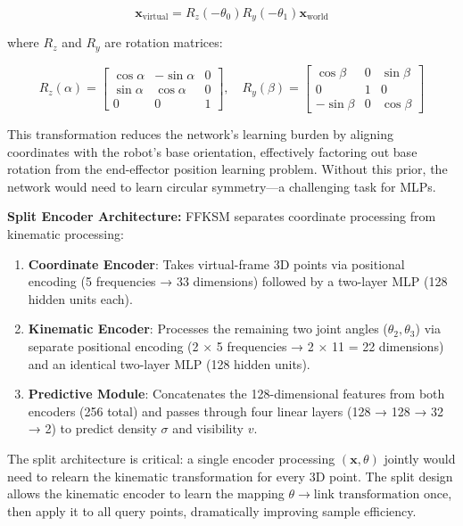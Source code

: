 \documentclass[12pt,a4paper,oneside]{report}
\begin{document}
\begin{equation}
\mathbf{x}_{\text{virtual}} = R_z(-\theta_0) R_y(-\theta_1) \mathbf{x}_{\text{world}}
\end{equation}

where $R_z$ and $R_y$ are rotation matrices:

\begin{equation}
R_z(\alpha) = \begin{bmatrix}
\cos\alpha & -\sin\alpha & 0 \\
\sin\alpha & \cos\alpha & 0 \\
0 & 0 & 1
\end{bmatrix}, \quad
R_y(\beta) = \begin{bmatrix}
\cos\beta & 0 & \sin\beta \\
0 & 1 & 0 \\
-\sin\beta & 0 & \cos\beta
\end{bmatrix}
\end{equation}

This transformation reduces the network's learning burden by aligning coordinates with the robot's base orientation, effectively factoring out base rotation from the end-effector position learning problem. Without this prior, the network would need to learn circular symmetry—a challenging task for MLPs.

\textbf{Split Encoder Architecture:} FFKSM separates coordinate processing from kinematic processing:

\begin{enumerate}
    \item \textbf{Coordinate Encoder}: Takes virtual-frame 3D points via positional encoding (5 frequencies → 33 dimensions) followed by a two-layer MLP (128 hidden units each).
    \item \textbf{Kinematic Encoder}: Processes the remaining two joint angles ($\theta_2, \theta_3$) via separate positional encoding (2 × 5 frequencies → 2 × 11 = 22 dimensions) and an identical two-layer MLP (128 hidden units).
    \item \textbf{Predictive Module}: Concatenates the 128-dimensional features from both encoders (256 total) and passes through four linear layers (128 → 128 → 32 → 2) to predict density $\sigma$ and visibility $v$.
\end{enumerate}

The split architecture is critical: a single encoder processing $(\mathbf{x}, \theta)$ jointly would need to relearn the kinematic transformation for every 3D point. The split design allows the kinematic encoder to learn the mapping $\theta \rightarrow \text{link transformation}$ once, then apply it to all query points, dramatically improving sample efficiency.
\end{document}
